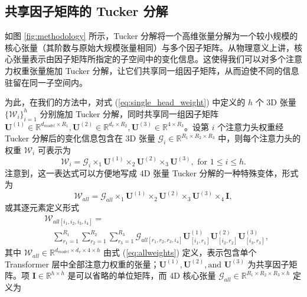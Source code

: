 \documentclass[conference]{IEEEtran}
\begin{document}
\subsection{共享因子矩阵的 Tucker 分解}
如图 \ref{fig:methodology} 所示，Tucker 分解将一个高维张量分解为一个较小规模的核心张量（其阶数与原始大规模张量相同）与多个因子矩阵。从物理意义上讲，核心张量表示由因子矩阵所指定的子空间中的变化信息。这使得我们可以对多个注意力权重张量施加 Tucker 分解，让它们共享同一组因子矩阵，从而迫使不同的信息驻留在同一子空间内。

为此，在我们的方法中，对式 (\ref{eq:single_head_weight}) 中定义的 $h$ 个 3D 张量 $\{\mathcal{W}_i \}_{i=1}^h$ 分别施加 Tucker 分解，同时共享同一组因子矩阵 $\mathbf{U}^{(1)} \in \mathbb{R}^{d_{model} \times R_1}, \mathbf{U}^{(2)} \in \mathbb{R}^{d_{v} \times R_2}, \mathbf{U}^{(3)} \in \mathbb{R}^{4 \times R_3}$。设第 $i$ 个注意力头权重经 Tucker 分解后的变化信息包含在 3D 张量 $\mathcal{G}_i \in \mathbb{R}^{R_1 \times R_2 \times R_3}$ 中，则每个注意力头的权重 $\mathcal{W}_i$ 可表示为
\begin{equation}
    \mathcal{W}_i = \mathcal{G}_i \times_1 \mathbf{U}^{(1)} \times_2 \mathbf{U}^{(2)} \times_3 \mathbf{U}^{(3)}, \text{ for } 1\leq i \leq h.
\label{eq:tucker_with_shared_factors_1}
\end{equation}
注意到，这一表达式可以方便地写成 4D 张量 Tucker 分解的一种特殊变体，形式为
\begin{equation}
    \mathcal{W}_{all} = \mathcal{G}_{all} \times_1 \mathbf{U}^{(1)} \times_2 \mathbf{U}^{(2)} \times_3 \mathbf{U}^{(3)} \times_4 \mathbf{I},
\label{eq:tucker_with_shared_factors}
\end{equation}
或其逐元素定义形式
\begin{equation}
\begin{split}
&\mathcal{W}_{all[i_1, i_2, i_3, i_4]} =  \\
&\quad \sum_{r_1=1}^{R_1} \sum_{r_2=1}^{R_2} \sum_{r_3=1}^{R_3} \mathcal{G}_{all [r_1, r_2, r_3, i_4]} \mathbf{U}^{(1)}_{[i_1, r_1]} \mathbf{U}^{(2)}_{[i_2, r_2]} \mathbf{U}^{(3)}_{[i_3, r_3]},
\end{split}
\label{eq:tucker_with_shared_factors_index_notation}
\end{equation}
其中 $\mathcal{W}_{all} \in \mathbb{R}^{d_{model} \times d_v \times 4 \times h}$ 由式 (\ref{eq:allweights}) 定义，表示包含单个 Transformer 层中全部注意力权重的张量；$\mathbf{U}^{(1)}, \mathbf{U}^{(2)}, \text{and } \mathbf{U}^{(3)}$ 为共享因子矩阵。项 $\mathbf{I} \in \mathbb{R}^{h\times h}$ 是可以省略的单位矩阵，而 4D 核心张量 $\mathcal{G}_{all} \in \mathbb{R}^{R_1 \times R_2 \times R_3 \times h}$ 定义为
\end{document}
